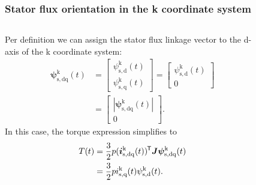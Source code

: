 \begin{frame}
	\frametitle{Stator flux orientation in the k coordinate system}
    \begin{columns}
		\begin{column}{0.55\textwidth}
	       Per definition we can assign the stator flux linkage vector to the d-axis of the k coordinate system:
           \begin{equation}
            \renewcommand{\arraystretch}{1.4}
            \begin{split}
                \bm{\psi}^\mathrm{k}_\mathrm{s,dq}(t) &= \begin{bmatrix} \psi_{\mathrm{s,d}}^\mathrm{k}(t) \\ \psi_{\mathrm{s,q}}^\mathrm{k}(t) \end{bmatrix} = \begin{bmatrix} \psi_{\mathrm{s,d}}^\mathrm{k}(t) \\ 0 \end{bmatrix}\\
                &= \begin{bmatrix}|\bm{\psi}^\mathrm{k}_\mathrm{s,dq}(t)| \\ 0 \end{bmatrix}.
            \end{split}
           \end{equation}
           In this case, the torque expression simplifies to
              \begin{equation}
                \begin{split}
                T(t) & = \frac{3}{2} p (\bm{i}_\mathrm{s,dq}^\mathrm{k}(t))^{\mkern-1.5mu\mathsf{T}}\bm{J}\bm{\psi}_\mathrm{s,dq}^\mathrm{k}(t)\\
                & = \frac{3}{2} p i_{\mathrm{s,q}}^\mathrm{k}(t)\psi_{\mathrm{s,d}}^\mathrm{k}(t) .
                \end{split}
                \label{eq:IM_model_k_torque_stator_flux_orientation}
                \end{equation}
        \end{column}
        \begin{column}{0.45\textwidth}
            \begin{figure}
                \centering

\end{figure}
\end{column}
\end{columns}
\end{frame}

